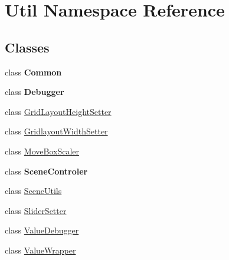 \hypertarget{namespace_util}{}\section{Util Namespace Reference}
\label{namespace_util}
\subsection*{Classes}
\begin{DoxyCompactItemize}
\item 
class {\bfseries Common}
\item 
class {\bfseries Debugger}
\item 
class \hyperlink{class_util_1_1_grid_layout_height_setter}{Grid\+Layout\+Height\+Setter}
\item 
class \hyperlink{class_util_1_1_gridlayout_width_setter}{Gridlayout\+Width\+Setter}
\item 
class \hyperlink{class_util_1_1_move_box_scaler}{Move\+Box\+Scaler}
\item 
class {\bfseries Scene\+Controler}
\item 
class \hyperlink{class_util_1_1_scene_utils}{Scene\+Utils}
\item 
class \hyperlink{class_util_1_1_slider_setter}{Slider\+Setter}
\item 
class \hyperlink{class_util_1_1_value_debugger}{Value\+Debugger}
\item 
class \hyperlink{class_util_1_1_value_wrapper}{Value\+Wrapper}
\end{DoxyCompactItemize}
